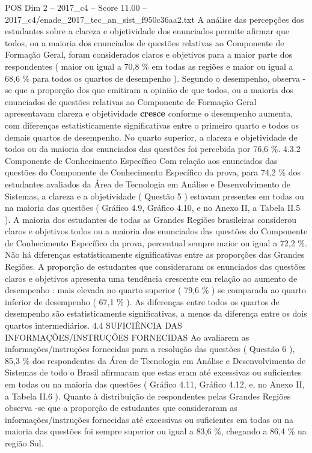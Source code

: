 \begin{textsample}{POS Dim 2 – 2017\_c4 – Score 11.00 – 2017\_c4/enade\_2017\_tec\_an\_sist\_f950c36aa2.txt}
A análise das percepções dos estudantes sobre a clareza e objetividade dos enunciados permite afirmar que todos, ou a maioria dos enunciados de questões relativas ao Componente de Formação Geral, foram considerados claros e objetivos para a maior parte dos respondentes ( maior ou igual a 70,8 \% em todas as regiões e maior ou igual a 68,6 \% para todos os quartos de desempenho ).
Segundo o desempenho, observa -se que a proporção dos que emitiram a opinião de que todos, ou a maioria dos enunciados de questões relativas ao Componente de Formação Geral apresentavam clareza e objetividade \textbf{cresce} conforme o desempenho aumenta, com diferenças estatisticamente significativas entre o primeiro quarto e todos os demais quartos de desempenho.
No quarto superior, a clareza e objetividade de todos ou da maioria dos enunciados das questões foi percebida por 76,6 \%. 4.3.2 Componente de Conhecimento Específico Com relação aos enunciados das questões do Componente de Conhecimento Específico da prova, para 74,2 \% dos estudantes avaliados da Área de Tecnologia em Análise e Desenvolvimento de Sistemas, a clareza e a objetividade ( Questão 5 ) estavam presentes em todas ou na maioria das questões ( Gráfico 4.9, Gráfico 4.10, e no Anexo II, a Tabela II.5 ).
A maioria dos estudantes de todas as Grandes Regiões brasileiras considerou claros e objetivos todos ou a maioria dos enunciados das questões do Componente de Conhecimento Específico da prova, percentual sempre maior ou igual a 72,2 \%.
Não há diferenças estatisticamente significativas entre as proporções das Grandes Regiões.
A proporção de estudantes que consideraram os enunciados das questões claros e objetivos apresenta uma tendência crescente em relação ao aumento de desempenho : mais elevada no quarto superior ( 79,6 \% ) se comparada ao quarto inferior de desempenho ( 67,1 \% ).
As diferenças entre todos os quartos de desempenho são estatisticamente significativas, a menos da diferença entre os dois quartos intermediários. 4.4 SUFICIÊNCIA DAS INFORMAÇÕES/INSTRUÇÕES FORNECIDAS Ao avaliarem as informações/instruções fornecidas para a resolução das questões ( Questão 6 ), 85,3 \% dos respondentes da Área de Tecnologia em Análise e Desenvolvimento de Sistemas de todo o Brasil afirmaram que estas eram até excessivas ou suficientes em todas ou na maioria das questões ( Gráfico 4.11, Gráfico 4.12, e, no Anexo II, a Tabela II.6 ).
Quanto à distribuição de respondentes pelas Grandes Regiões observa -se que a proporção de estudantes que consideraram as informações/instruções fornecidas até excessivas ou suficientes em todas ou na maioria das questões foi sempre superior ou igual a 83,6 \%, chegando a 86,4 \% na região Sul.

\end{textsample}
